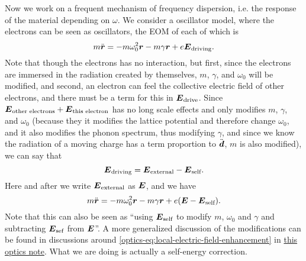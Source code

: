 \documentclass[hyperref, a4paper]{article}
\newcommand{\opticsdoc}{\href{../optics/optics.pdf}{this optics note}}
\begin{document}
Now we work on a frequent mechanism of frequency dispersion, i.e. the response of the material depending on 
$\omega$. We consider a oscillator model, where the electrons can be seen as oscillators, 
the EOM of each of which is
\begin{equation}
    m \ddot{\vb*{r}} = - m \omega_0^2 \vb*{r} - m \gamma \vb*{r} + e \vb*{E}_\text{driving}.
\end{equation}
Note that though the electrons has no interaction, but first, since the electrons are immersed in the 
radiation created by themselves, $m$, $\gamma$, and $\omega_0$ will be modified, and second, an electron 
can feel the collective electric field of other electrons, and there must be a term for this in 
$\vb*{E}_\text{drive}$. Since $\vb*{E}_\text{other electrons} + \vb*{E}_\text{this electron}$ has no
long scale effects and only modifies $m$, $\gamma$, and $\omega_0$ (because they it modifies the lattice potential
and therefore change $\omega_0$, and it also modifies the phonon spectrum, thus modifying $\gamma$, and 
since we know the radiation of a moving charge has a term proportion to $\ddot{\vb*{d}}$, $m$ is also modified),
we can say that 
\[
    \vb*{E}_\text{driving} = \vb*{E}_\text{external} - \vb*{E}_\text{self}.
\]
Here and after we write $\vb*{E}_\text{external}$ as $\vb*{E}$, and we have 
\begin{equation}
    m \ddot{\vb*{r}} = - m \omega_0^2 \vb*{r} - m \gamma \vb*{r} + e (\vb*{E} - \vb*{E}_\text{self}).
\end{equation}
Note that this can also be seen as ``using $\vb*{E}_\text{self}$ to modify $m$, $\omega_0$ and $\gamma$ and
subtracting $\vb*{E}_\text{sef}$ from $\vb*{E}$''. A more generalized discussion of the modifications 
can be found in discussions around \eqref{optics-eq:local-electric-field-enhancement} in \opticsdoc.
What we are doing is actually a self-energy correction.
\end{document}
